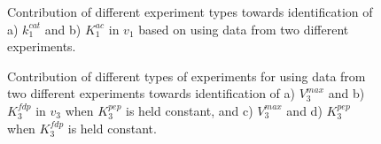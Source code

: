 \documentclass[10pt]{article}
\begin{document}
	\begin{figure}[!tbhp]
		\caption{Contribution of different experiment types towards identification of a) $k_1^{cat}$ and b) $K_1^{ac}$ in $v_1$ based on using data from two different experiments.}%
	\end{figure} 	

	\begin{figure}[!tbhp]
		\caption{Contribution of different types of experiments for using data from two different experiments towards identification of a) $V_3^{max}$ and b) $K_3^{fdp}$ in $v_3$ when $K_3^{pep}$ is held constant, and c) $V_3^{max}$ and d) $K_3^{pep}$ when $K_3^{fdp}$ is held constant.}%
	\end{figure}	
\end{document}
